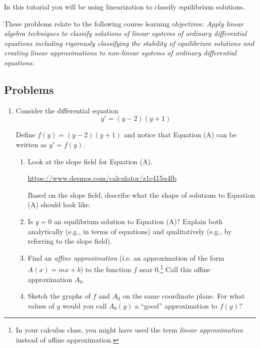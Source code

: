 \begin{objectives}
	In this tutorial you will be using linearization to classify equilibrium solutions.

	These problems relate to the following course learning objectives:
	\textit{Apply linear algebra techniques to classify solutions of linear systems of ordinary differential
	equations including rigorously classifying the stability of equilibrium solutions and creating
	linear approximations to non-linear systems of ordinary differential equations}.
\end{objectives}


\subsection*{Problems}

\begin{enumerate}
	\item 	Consider the differential equation
	      \begin{equation}
		      y'=(y-2)(y+1)\tag{A}
	      \end{equation}

	      Define $f(y)=(y-2)(y+1)$ and notice that Equation (A) can be written as $y'=f(y)$.

	      \begin{enumerate}
		      \item Look at the slope field for Equation (A).

		            \url{https://www.desmos.com/calculator/z1c415u4fb}

		            Based on the slope field, describe what the shape of solutions to Equation (A) should look like.

		      \item Is $y=0$ an equilibrium solution to Equation (A)? Explain both analytically (e.g., in terms of equations)
		            and qualitatively (e.g., by referring to the slope field).
		      \item Find an \emph{affine approximation} (i.e. an approximation of the form $A(x) = m x+b$)
		            to the function $f$ near $0$.\footnote{ In your calculus class, you might have used the term
			            \emph{linear approximation} instead of affine approximation.} Call this affine approximation $A_0$.

		      \item\label{sketch} Sketch the graphs of $f$ and $A_0$ on the same coordinate plane. For what values of $y$ would you
		            call $A_0(y)$ a ``good'' approximation to $f(y)$?


\end{enumerate}
\end{enumerate}
